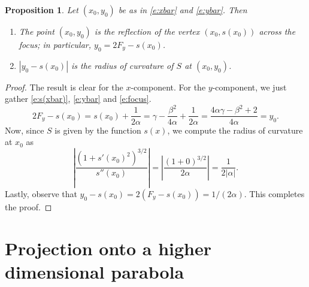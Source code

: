 \documentclass[11pt]{article}
\newtheorem{proposition}[theorem]{Proposition}
\begin{document}
\begin{proposition}
    Let $(x_0,y_0)$ be as in \cref{e:xbar} and \cref{e:ybar}. Then
    \begin{enumerate}
        \item The point $(x_0,y_0)$ is the reflection of the vertex $(x_0,s(x_0))$ across the focus; in particular, $y_0=2F_y-s(x_0)$.
        \item $|y_0-s(x_0)|$ is the radius of curvature of $S$ at $(x_0,y_0)$.
    \end{enumerate}
\end{proposition}

\begin{proof}
    The result is clear for the $x$-component. 
    For the $y$-component, we just gather \cref{e:s(xbar)}, \cref{e:ybar} and \cref{e:focus}.
    \[2F_y-s(x_0)=s(x_0)+\frac1{2\alpha}=\gamma-\frac{\beta^2}{4\alpha}+\frac1{2\alpha}=\frac{4\alpha\gamma-\beta^2+2}{4\alpha}=y_0.\]
    Now, since $S$ is given by the function $s(x)$, we compute the radius of curvature at $x_0$ as
    \[\left|\frac{(1+s'(x_0)^2)^{3/2}}{s''(x_0)}\right|=\left|\frac{(1+0)^{3/2}}{2\alpha}\right|=\frac{1}{2|\alpha|}.\]
    Lastly, observe that $y_0-s(x_0)=2(F_y-s(x_0))=1/(2\alpha)$. 
    This completes the proof. 
\end{proof}

\section{Projection onto a higher dimensional parabola}\label{sec:higher}
\end{document}
